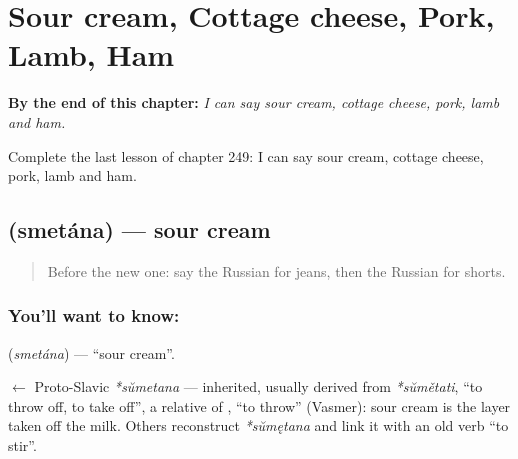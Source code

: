 
\chapter{Sour cream, Cottage cheese, Pork, Lamb, Ham}
\label{ch:ru-sour-cream-cottage-cheese-pork-lamb-ham}

\begin{chapteropening}
\textbf{By the end of this chapter:} \emph{I can say sour cream, cottage cheese, pork, lamb and ham.}

Complete the last lesson of chapter 249: I can say sour cream, cottage cheese, pork, lamb and ham.
\end{chapteropening}

\section[\texorpdfstring{\ru{сметана} (smetána)}{сметана (smetána)}]{ (smetána) — sour cream}

\label{lesson:RU-C249-smetana}



\begin{quote}
Before the new one: say the Russian for jeans, then the Russian for shorts.
\end{quote}

\subsection*{You'll want to know: }
\textbf{} (\emph{smetána}) — \textquotedblleft{}sour cream\textquotedblright{}.

\begin{cousinweb}
\textbf{} $\leftarrow$ Proto-Slavic \emph{*sŭmetana} — inherited, usually derived from \emph{*sŭmětati}, \textquotedblleft{}to throw off, to take off\textquotedblright{}, a relative of \emph{}, \textquotedblleft{}to throw\textquotedblright{} (Vasmer): sour cream is the layer taken off the milk. Others reconstruct \emph{*sŭmętana} and link it with an old verb \textquotedblleft{}to stir\textquotedblright{}.
\end{cousinweb}

